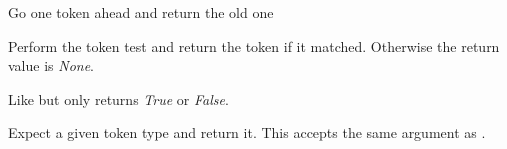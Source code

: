 \documentclass[a4paper,10pt,english]{sphinxmanual}
\begin{document}
\begin{fulllineitems}

\begin{fulllineitems}
\label{extensions:jinja2.lexer.TokenStream.next}
Go one token ahead and return the old one

\end{fulllineitems}


\begin{fulllineitems}
\label{extensions:jinja2.lexer.TokenStream.next_if}
Perform the token test and return the token if it matched.
Otherwise the return value is \emph{None}.

\end{fulllineitems}


\begin{fulllineitems}
\label{extensions:jinja2.lexer.TokenStream.skip_if}
Like  but only returns \emph{True} or \emph{False}.

\end{fulllineitems}


\begin{fulllineitems}
\label{extensions:jinja2.lexer.TokenStream.expect}
Expect a given token type and return it.  This accepts the same
argument as {\hyperref[extensions:jinja2.lexer.Token.test]{}}.

\end{fulllineitems}


\end{fulllineitems}

\end{document}
